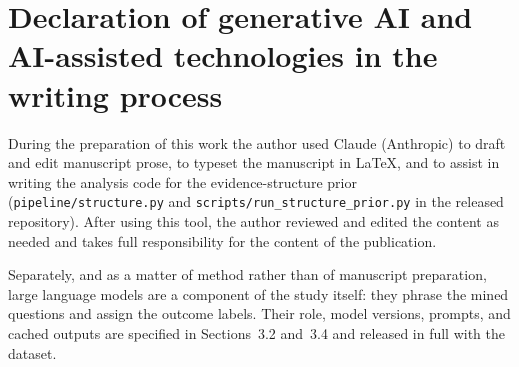 \documentclass[11pt]{article}
\begin{document}
\section*{Declaration of generative AI and AI-assisted technologies in the
writing process}

During the preparation of this work the author used Claude (Anthropic) to
draft and edit manuscript prose, to typeset the manuscript in \LaTeX, and to
assist in writing the analysis code for the evidence-structure prior
(\texttt{pipeline/structure.py} and \texttt{scripts/run\_structure\_prior.py}
in the released repository). After using this tool, the author reviewed and
edited the content as needed and takes full responsibility for the content of
the publication.

Separately, and as a matter of method rather than of manuscript preparation,
large language models are a component of the study itself: they phrase the
mined questions and assign the outcome labels. Their role, model versions,
prompts, and cached outputs are specified in Sections~3.2 and~3.4 and
released in full with the dataset.
\end{document}
